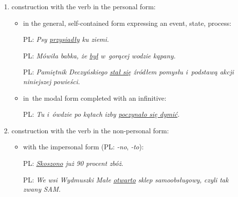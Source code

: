 \documentclass{udisc}
\begin{document}
\begin{enumerate}

\item construction with the verb in the personal form:

      \begin{itemize}

      \item in the general, self-contained form expressing an event, state, process:

            \begin{ex}
            PL: \textit{Psy \uline{przysiadły} ku ziemi.}
            \end{ex}

            \begin{ex}
            PL: \textit{Mówiła babka, że \uline{był} w~gorącej wodzie kąpany.}
            \end{ex}
            
            \begin{ex}
            PL: \textit{Pamiętnik Deczyńskiego \uline{stał się} źródłem
                pomysłu i~podstawą akcji niniejszej powieści.}
            \end{ex}

      \item in~the modal form completed with an infinitive:

            \begin{ex}
            PL: \textit{Tu i~ówdzie po kątach izby \uline{poczynało się dymić}.}
            \end{ex}

      \end{itemize}

\vspace{5pt}\item construction with the verb in the non-personal form:

      \begin{itemize}

      \item with the impersonal form (PL: \textit{-no}, \textit{-to}):

            \begin{ex}
            PL: \textit{\uline{Skoszono} już 90 procent zbóż}.
            \end{ex}

            \begin{ex}
            PL: \textit{We wsi Wydmuszki Małe \uline{otwarto} sklep samoobsługowy, czyli tak zwany SAM.}
            \end{ex}


\end{itemize}
\end{enumerate}
\end{document}

